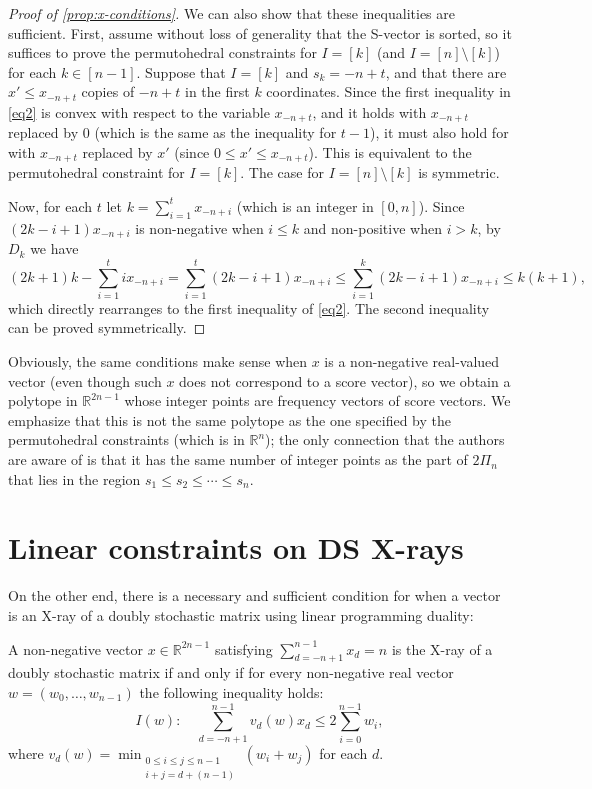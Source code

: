 \documentclass[letterpaper,reqno,11pt]{amsart}
\begin{document}
\begin{proof}[Proof of \cref{prop:x-conditions}]
    We can also show that these inequalities are sufficient. First, assume without loss of generality that the S-vector is sorted, so it suffices to prove the permutohedral constraints for $I = [k]$ (and $I = [n]\setminus [k]$) for each $k \in [n-1]$. Suppose that $I = [k]$ and $s_k = -n+t$, and that there are $x'\leq x_{-n+t}$ copies of $-n+t$ in the first $k$ coordinates. Since the first inequality in \eqref{eq2} is convex with respect to the variable $x_{-n+t}$, and it holds with $x_{-n+t}$ replaced by $0$ (which is the same as the inequality for $t-1$), it must also hold for with $x_{-n+t}$ replaced by $x'$ (since $0\leq x' \leq x_{-n+t}$). This is equivalent to the permutohedral constraint for $I = [k]$. The case for $I = [n]\setminus [k]$ is symmetric.

    Now, for each $t$ let $k = \sum_{i=1}^t x_{-n+i}$ (which is an integer in $[0, n]$). Since $(2k-i+1)x_{-n+i}$ is non-negative when $i\leq k$ and non-positive when $i > k$, by $D_k$ we have \[(2k+1)k-\sum_{i=1}^t ix_{-n+i} = \sum_{i=1}^{t} (2k-i+1) x_{-n+i} \leq \sum_{i=1}^{k} (2k-i+1) x_{-n+i}\leq k(k+1),\] which directly rearranges to the first inequality of \eqref{eq2}. The second inequality can be proved symmetrically.
\end{proof}

Obviously, the same conditions make sense when $x$ is a non-negative real-valued vector (even though such $x$ does not correspond to a score vector), so we obtain a polytope in $\mathbb{R}^{2n-1}$ whose integer points are frequency vectors of score vectors. We emphasize that this is not the same polytope as the one specified by the permutohedral constraints (which is in $\mathbb{R}^n$); the only connection that the authors are aware of is that it has the same number of integer points as the part of $2\Pi_n$ that lies in the region $s_1\leq s_2\leq \cdots \leq s_n$.

\section{Linear constraints on DS X-rays} \label{sec:lin_xray}

On the other end, there is a necessary and sufficient condition for when a vector is an X-ray of a doubly stochastic matrix using linear programming duality:

\begin{proposition}\label{prop:w-conditions}
    A non-negative vector $x\in \mathbb{R}^{2n-1}$ satisfying $\sum\limits_{d=-n+1}^{n-1} x_d = n$ is the X-ray of a doubly stochastic matrix if and only if for every non-negative real vector $w = (w_0, \dots, w_{n-1})$ the following inequality holds: \begin{equation}
        I(w):\quad \sum_{d=-n+1}^{n-1} v_d(w) x_d \leq 2\sum_{i=0}^{n-1} w_i,
    \end{equation} where $v_d(w) = \min_{\substack{0\leq i\leq j\leq n-1\\ i+j=d+(n-1)}} (w_i + w_j)$ for each $d$.
\end{proposition}
\end{document}
